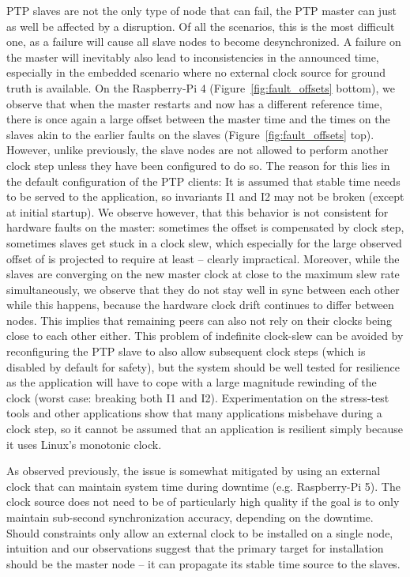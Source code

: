 PTP slaves are not the only type of node that can fail, the PTP master can just as well be affected by a disruption. Of all the scenarios, this is the most difficult one, as a failure will cause all slave nodes to become desynchronized. A failure on the master will inevitably also lead to inconsistencies in the announced time, especially in the embedded scenario where no external clock source for ground truth is available. On the Raspberry-Pi 4 (Figure~\ref{fig:fault_offsets} bottom), we observe that when the master restarts and now has a different reference time, there is once again a large offset between the master time and the times on the slaves akin to the earlier faults on the slaves (Figure~\ref{fig:fault_offsets} top). However, unlike previously, the slave nodes are not allowed to perform another clock step unless they have been configured to do so. The reason for this lies in the default configuration of the PTP clients: It is assumed that stable time needs to be served to the application, so invariants I1 and I2 may not be broken (except at initial startup). We observe however, that this behavior is not consistent for hardware faults on the master: sometimes the offset is compensated by clock step, sometimes slaves get stuck in a clock slew, which especially for the large observed offset of \fTimeMin{\maxPiFour} is projected to require at least \fTimeMin[-3]{\maxPiFour/\maxClockSlew} -- clearly impractical. Moreover, while the slaves are converging on the new master clock at close to the maximum slew rate simultaneously, we observe that they do not stay well in sync between each other while this happens, because the hardware clock drift continues to differ between nodes. This implies that remaining peers can also not rely on their clocks being close to each other either. This problem of indefinite clock-slew can be avoided by reconfiguring the PTP slave to also allow subsequent clock steps (which is disabled by default for safety), but the system should be well tested for resilience as the application will have to cope with a large magnitude rewinding of the clock (worst case: breaking both I1 and I2). Experimentation on the stress-test tools and other applications show that many applications misbehave during a clock step, so it cannot be assumed that an application is resilient simply because it uses Linux's monotonic clock.

As observed previously, the issue is somewhat mitigated by using an external clock that can maintain system time during downtime (e.g. Raspberry-Pi 5). The clock source does not need to be of particularly high quality if the goal is to only maintain sub-second synchronization accuracy, depending on the downtime. Should constraints only allow an external clock to be installed on a single node, intuition and our observations suggest that the primary target for installation should be the master node -- it can propagate its stable time source to the slaves.

